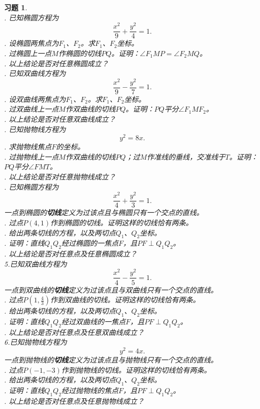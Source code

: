 \documentclass[12pt,UTF8]{ctexbook}
\theoremstyle{definition}
\theoremstyle{plain}
\newtheorem{xt}{习题}[section]
\begin{document}
\begin{xt}
    \mbox{} \\
    . 已知椭圆方程为
    $$ \frac{x^2}{9} + \frac{y^2}{4} = 1.$$
    . 设椭圆两焦点为$F_1$、$F_2$。求$F_1$、$F_2$坐标。\\
    . 过椭圆上一点$M$作椭圆的切线$PQ$。证明：$\angle F_1MP = \angle F_2MQ$。\\
    . 以上结论是否对任意椭圆成立？\\
    . 已知双曲线方程为
    $$ \frac{x^2}{9} - \frac{y^2}{7} = 1.$$
    . 设双曲线两焦点为$F_1$、$F_2$。求$F_1$、$F_2$坐标。\\
    . 过双曲线上一点$M$作双曲线的切线$PQ$。证明：$PQ$平分$\angle F_1MF_2$。\\
    . 以上结论是否对任意双曲线成立？\\
    . 已知抛物线方程为
    $$ y^2 = 8x.$$
    . 求抛物线焦点$F$的坐标。\\
    . 过抛物线上一点$M$作双曲线的切线$PQ$；过$M$作准线的垂线，交准线于$T$。证明：$PQ$平分$\angle FMT$。\\
    . 以上结论是否对任意抛物线成立？\\
    . 已知椭圆方程为
    $$ \frac{x^2}{4} + \frac{y^2}{3} = 1.$$
    一点到椭圆的\textbf{切线}定义为过该点且与椭圆只有一个交点的直线。\\
    . 过点$P(4, 1)$作到椭圆的切线。证明这样的切线恰有两条。\\
    . 给出两条切线的方程，以及两切点$Q_1$、$Q_2$坐标。\\
    . 证明：直线$Q_1Q_2$经过椭圆的一焦点$F$，且$PF\perp Q_1Q_2$。\\
    . 以上结论是否对任意点及任意椭圆成立？\\
    \indent 5.已知双曲线方程为
    $$ \frac{x^2}{4} - \frac{y^2}{5} = 1.$$ 
    一点到双曲线的\textbf{切线}定义为过该点且与双曲线只有一个交点的直线。\\
    . 过点$P\left(1, \frac{4}{3}\right)$作到双曲线的切线。证明这样的切线恰有两条。\\
    . 给出两条切线的方程，以及两切点$Q_1$、$Q_2$坐标。\\
    . 证明：直线$Q_1Q_2$经过双曲线的一焦点$F$，且$PF\perp Q_1Q_2$。\\
    . 以上结论是否对任意点及任意双曲线成立？\\
    \indent 6.已知抛物线方程为
    $$ y^2 = 4x.$$ 
    一点到抛物线的\textbf{切线}定义为过该点且与抛物线只有一个交点的直线。\\
    . 过点$P(-1, -3)$作到抛物线的切线。证明这样的切线恰有两条。\\
    . 给出两条切线的方程，以及两切点$Q_1$、$Q_2$坐标。\\
    . 证明：直线$Q_1Q_2$经过抛物线的焦点$F$，且$PF\perp Q_1Q_2$。\\
    . 以上结论是否对任意点及任意抛物线成立？\\
    
\end{xt}
\end{document}
